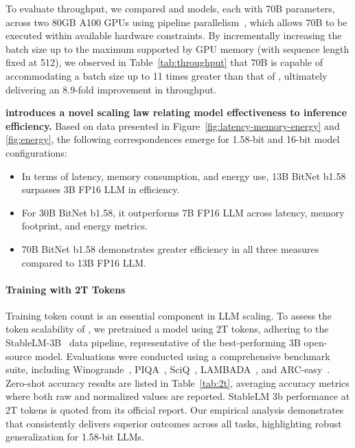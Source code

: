 To evaluate throughput, we compared  and  models, each with 70B parameters, across two 80GB A100 GPUs using pipeline parallelism~\cite{gpipe}, which allows  70B to be executed within available hardware constraints. By incrementally increasing the batch size up to the maximum supported by GPU memory (with sequence length fixed at 512), we observed in Table~\ref{tab:throughput} that  70B is capable of accommodating a batch size up to 11 times greater than that of , ultimately delivering an 8.9-fold improvement in throughput.

\textbf{ introduces a novel scaling law relating model effectiveness to inference efficiency.} Based on data presented in Figure~\ref{fig:latency-memory-energy} and \ref{fig:energy}, the following correspondences emerge for 1.58-bit and 16-bit model configurations:

\begin{itemize}
    \item In terms of latency, memory consumption, and energy use, 13B BitNet b1.58 surpasses 3B FP16 LLM in efficiency.
    \item For 30B BitNet b1.58, it outperforms 7B FP16 LLM across latency, memory footprint, and energy metrics.
    \item 70B BitNet b1.58 demonstrates greater efficiency in all three measures compared to 13B FP16 LLM.
\end{itemize}

\paragraph{Training with 2T Tokens}

Training token count is an essential component in LLM scaling. To assess the token scalability of , we pretrained a  model using 2T tokens, adhering to the StableLM-3B~\cite{StableLM-3B-4E1T} data pipeline, representative of the best-performing 3B open-source model. Evaluations were conducted using a comprehensive benchmark suite, including Winogrande~\cite{winoGrande}, PIQA~\cite{piqa}, SciQ~\cite{sciq}, LAMBADA~\cite{lambada}, and ARC-easy~\cite{arc}. Zero-shot accuracy results are listed in Table~\ref{tab:2t}, averaging accuracy metrics where both raw and normalized values are reported. StableLM 3b performance at 2T tokens is quoted from its official report. Our empirical analysis demonstrates that  consistently delivers superior outcomes across all tasks, highlighting robust generalization for 1.58-bit LLMs.

